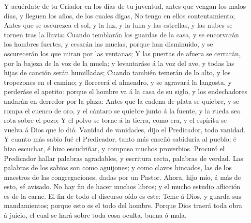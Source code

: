  Y acuérdate de tu Criador en los días de tu juventud, antes
que vengan los malos días, y lleguen los años, de los cuales digas, No
tengo en ellos contentamiento;  Antes que se oscurezca el
sol, y la luz, y la luna y las estrellas, y las nubes se tornen tras la
lluvia:  Cuando temblarán los guardas de la casa, y se
encorvarán los hombres fuertes, y cesarán las muelas, porque han
disminuído, y se oscurecerán los que miran por las ventanas;
 Y las puertas de afuera se cerrarán, por la bajeza de la
voz de la muela; y levantaráse á la voz del ave, y todas las hijas de
canción serán humilladas;  Cuando también temerán de lo
alto, y los tropezones en el camino; y florecerá el almendro, y se
agravará la langosta, y perderáse el apetito: porque el hombre va á la
casa de su siglo, y los endechadores andarán en derredor por la plaza:
 Antes que la cadena de plata se quiebre, y se rompa el
cuenco de oro, y el cántaro se quiebre junto á la fuente, y la rueda sea
rota sobre el pozo;  Y el polvo se torne á la tierra, como
era, y el espíritu se vuelva á Dios que lo dió.  Vanidad de
vanidades, dijo el Predicador, todo vanidad.  Y cuanto más
sabio fué el Predicador, tanto más enseñó sabiduría al pueblo; é hizo
escuchar, é hizo escudriñar, y compuso muchos proverbios. 
Procuró el Predicador hallar palabras agradables, y escritura recta,
palabras de verdad.  Las palabras de los sabios son como
aguijones; y como clavos hincados, las de los maestros de las
congregaciones, dadas por un Pastor.  Ahora, hijo mío, á
más de esto, sé avisado. No hay fin de hacer muchos libros; y el mucho
estudio aflicción es de la carne.  El fin de todo el
discurso oído es este: Teme á Dios, y guarda sus mandamientos; porque
esto es el todo del hombre.  Porque Dios traerá toda obra á
juicio, el cual se hará sobre toda cosa oculta, buena ó mala.
